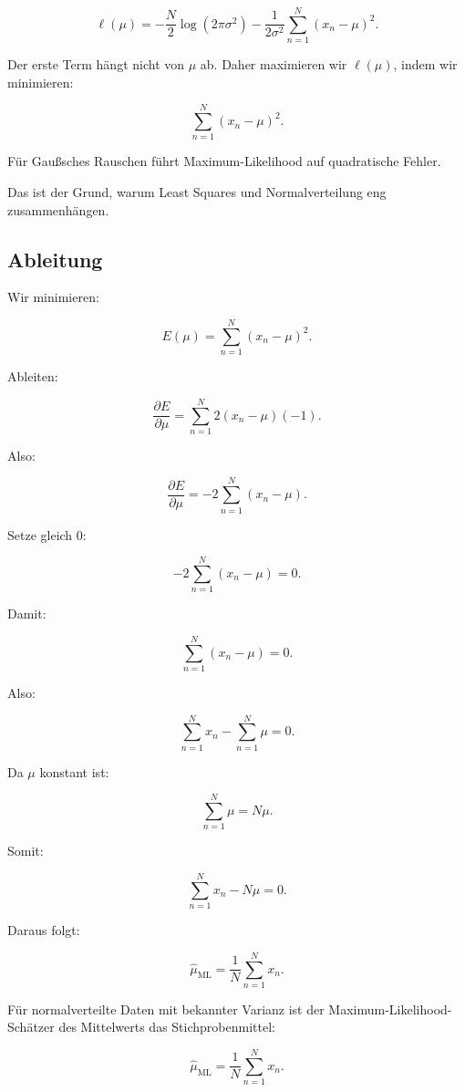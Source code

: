 \[
    \ell(\mu)
    =
    -\frac{N}{2}\log(2\pi\sigma^2)
    -
    \frac{1}{2\sigma^2}
    \sum_{n=1}^{N}
    (x_n-\mu)^2.
\]

Der erste Term hängt nicht von \(\mu\) ab.
Daher maximieren wir \(\ell(\mu)\), indem wir minimieren:

\[
    \sum_{n=1}^{N}
    (x_n-\mu)^2.
\]

\begin{conceptbox}
Für Gaußsches Rauschen führt Maximum-Likelihood auf quadratische Fehler.

Das ist der Grund, warum Least Squares und Normalverteilung eng zusammenhängen.
\end{conceptbox}

\subsection{Ableitung}

Wir minimieren:

\[
    E(\mu)
    =
    \sum_{n=1}^{N}
    (x_n-\mu)^2.
\]

Ableiten:

\[
    \frac{\partial E}{\partial \mu}
    =
    \sum_{n=1}^{N}
    2(x_n-\mu)(-1).
\]

Also:

\[
    \frac{\partial E}{\partial \mu}
    =
    -2
    \sum_{n=1}^{N}
    (x_n-\mu).
\]

Setze gleich \(0\):

\[
    -2
    \sum_{n=1}^{N}
    (x_n-\mu)
    =
    0.
\]

Damit:

\[
    \sum_{n=1}^{N}
    (x_n-\mu)
    =
    0.
\]

Also:

\[
    \sum_{n=1}^{N}
    x_n
    -
    \sum_{n=1}^{N}
    \mu
    =
    0.
\]

Da \(\mu\) konstant ist:

\[
    \sum_{n=1}^{N}
    \mu
    =
    N\mu.
\]

Somit:

\[
    \sum_{n=1}^{N}
    x_n
    -
    N\mu
    =
    0.
\]

Daraus folgt:

\[
    \hat{\mu}_{\mathrm{ML}}
    =
    \frac{1}{N}
    \sum_{n=1}^{N}
    x_n.
\]

\begin{definitionbox}
Für normalverteilte Daten mit bekannter Varianz ist der Maximum-Likelihood-Schätzer des Mittelwerts das Stichprobenmittel:

\[
    \hat{\mu}_{\mathrm{ML}}
    =
    \frac{1}{N}
    \sum_{n=1}^{N}
    x_n.
\]
\end{definitionbox}


